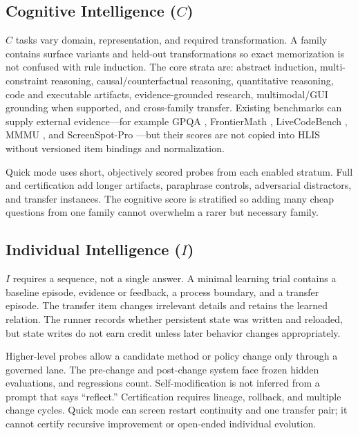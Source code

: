 \documentclass[11pt]{article}
\theoremstyle{definition}
\begin{document}
\subsection{Cognitive Intelligence ($C$)}

$C$ tasks vary domain, representation, and required transformation. A family contains surface variants and held-out transformations so exact memorization is not confused with rule induction. The core strata are: abstract induction, multi-constraint reasoning, causal/counterfactual reasoning, quantitative reasoning, code and executable artifacts, evidence-grounded research, multimodal/GUI grounding when supported, and cross-family transfer. Existing benchmarks can supply external evidence---for example GPQA \citep{rein2023gpqa}, FrontierMath \citep{glazer2024frontiermath}, LiveCodeBench \citep{jain2024livecodebench}, MMMU \citep{yue2023mmmu}, and ScreenSpot-Pro \citep{li2025screenspotpro}---but their scores are not copied into HLIS without versioned item bindings and normalization.

Quick mode uses short, objectively scored probes from each enabled stratum. Full and certification add longer artifacts, paraphrase controls, adversarial distractors, and transfer instances. The cognitive score is stratified so adding many cheap questions from one family cannot overwhelm a rarer but necessary family.

\subsection{Individual Intelligence ($I$)}

$I$ requires a sequence, not a single answer. A minimal learning trial contains a baseline episode, evidence or feedback, a process boundary, and a transfer episode. The transfer item changes irrelevant details and retains the learned relation. The runner records whether persistent state was written and reloaded, but state writes do not earn credit unless later behavior changes appropriately.

Higher-level probes allow a candidate method or policy change only through a governed lane. The pre-change and post-change system face frozen hidden evaluations, and regressions count. Self-modification is not inferred from a prompt that says ``reflect.'' Certification requires lineage, rollback, and multiple change cycles. Quick mode can screen restart continuity and one transfer pair; it cannot certify recursive improvement or open-ended individual evolution.
\end{document}
